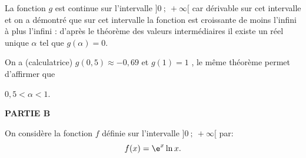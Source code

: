 \begin{enumerate}
La fonction $g$ est continue sur l'intervalle $]0~;~+\infty[$ car dérivable sur cet intervalle et on a démontré que sur cet intervalle la fonction est croissante de moins l'infini à plus l'infini : d'après le théorème des valeurs intermédiaires il existe un réel unique $\alpha$ tel que $g(\alpha) = 0$.

On a (calculatrice) $g(0,5) \approx - 0,69$ et $g(1) = 1$ , le même théorème permet d'affirmer que 

$0,5 < \alpha < 1$.
\end{enumerate}

\medskip

\textbf{PARTIE B}

\medskip

On considère la fonction $f$ définie sur l'intervalle $]0~;~+\infty[$ par: 
\[f(x) = \e^x \ln x.\]


